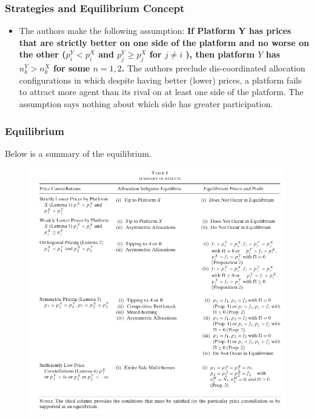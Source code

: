 \documentclass[11pt]{beamer}
\theoremstyle{boldstyle}
\begin{document}
		\begin{frame}
	\frametitle{Strategies and Equilibrium Concept}
	\begin{small}
		\begin{itemize}

			\item 
			The authors make the following assumption: \textbf{If Platform Y has prices that are strictly better on one side of the platform and no worse on the other ($p_i^Y<p_i^X$ and $p_j^Y \geq p_j^X$ for $j \neq i$ ), then platform $Y$ has $n_k^Y > n_k^X$ for some $n=1,2$.} The authors preclude dis-coordinated allocation configurations in which despite having better (lower) prices, a platform fails to attract more agent than its rival on at least one side of the platform. The assumption says nothing about which side has greater participation. 
			
		\end{itemize}
	\end{small}
\end{frame}

\begin{frame}
	\frametitle{Equilibrium}
	Below is a summary of the equilibrium.
	\begin{figure}
		\centering
		\includegraphics[width=0.6\linewidth]{eq.png}  %
		\label{fig:equilibriumsummary}
	\end{figure}
\end{frame}
\end{document}
